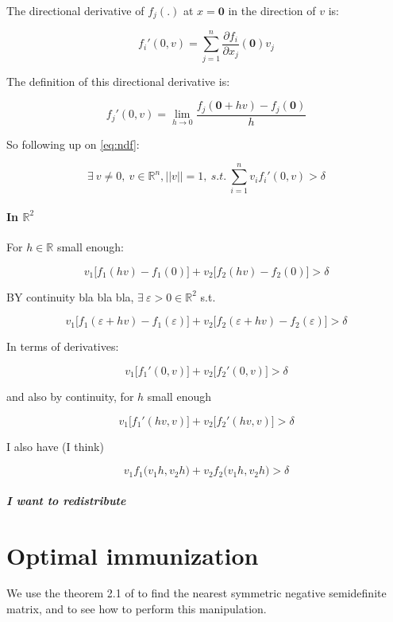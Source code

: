 \documentclass[12pt]{article}
\newcommand\ddfrac[2]{\frac{\displaystyle #1}{\displaystyle #2}}
\begin{document}
The directional derivative of $f_j(.)$ at $x=\bm{0}$ in the direction of $v$ is:

\[ f_i'(0,v) = \sum_{j=1}^n \ddfrac{\partial f_i}{\partial x_j}(\bm{0}) v_j \]

The definition of this directional derivative is:

\[  f_j'(0,v) = \lim_{h \rightarrow 0} \ddfrac{f_j(\bm{0} + h v)-f_j(\bm{0})}{h} \]

So following up on \eqref{eq:ndf}:

\begin{equation} \exists \ v \neq 0, \ v \in \mathbb{R}^n, ||v||=1, \ s.t. \ \sum_{i=1}^n v_i f_i'(0,v) > \delta 
\label{eq:ndf2}
\end{equation}

\paragraph{In $\mathbb{R}^2$}

For $h \in \mathbb{R}$ small enough:

\[ v_1 \big[ f_1(hv)-f_1(0) \big] + v_2 \big[ f_2(hv)-f_2(0) \big] > \delta \]

BY continuity bla bla bla, $\exists \ \varepsilon >0 \in \mathbb{R}^2$ s.t.

\[ v_1 \big[ f_1(\varepsilon+hv)-f_1(\varepsilon) \big] + v_2 \big[ f_2(\varepsilon + hv)-f_2(\varepsilon) \big] > \delta \]

In terms of derivatives:

\[ v_1 \big[ f_1'(0,v)  \big] + v_2 \big[ f_2'(0,v) \big] > \delta \]

and also by continuity, for $h$ small enough

\[ v_1 \big[ f_1'(hv,v)  \big] + v_2 \big[ f_2'(hv,v) \big] > \delta \]

I also have (I think)

\[ v_1 f_1\big(v_1 h, v_2 h \big) +  v_2 f_2\big(v_1 h, v_2 h \big) > \delta \] 

\subparagraph{I want to redistribute}


\section{Optimal immunization}

We use the theorem 2.1 of \cite{highamtheorem} to find the nearest symmetric negative semidefinite matrix, and to see how to perform this manipulation.
\end{document}
